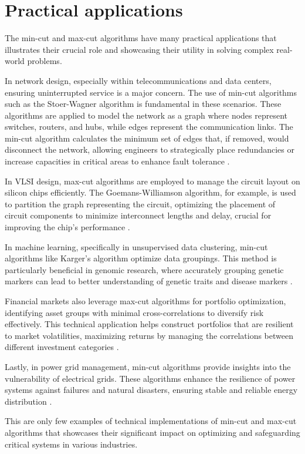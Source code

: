 \section{Practical applications}

The min-cut and max-cut algorithms have many practical applications that illustrates their crucial role and showcasing their utility in solving complex real-world problems.

In network design, especially within telecommunications and data centers, ensuring uninterrupted service is a major concern. The use of min-cut algorithms such as the Stoer-Wagner algorithm is fundamental in these scenarios. These algorithms are applied to model the network as a graph where nodes represent switches, routers, and hubs, while edges represent the communication links. The min-cut algorithm calculates the minimum set of edges that, if removed, would disconnect the network, allowing engineers to strategically place redundancies or increase capacities in critical areas to enhance fault tolerance \cite{stoer1997simple}.

In VLSI design, max-cut algorithms are employed to manage the circuit layout on silicon chips efficiently. The Goemans-Williamson algorithm, for example, is used to partition the graph representing the circuit, optimizing the placement of circuit components to minimize interconnect lengths and delay, crucial for improving the chip's performance \cite{goemans1995improved}.

In machine learning, specifically in unsupervised data clustering, min-cut algorithms like Karger's algorithm optimize data groupings. This method is particularly beneficial in genomic research, where accurately grouping genetic markers can lead to better understanding of genetic traits and disease markers \cite{karger1993global}.

Financial markets also leverage max-cut algorithms for portfolio optimization, identifying asset groups with minimal cross-correlations to diversify risk effectively. This technical application helps construct portfolios that are resilient to market volatilities, maximizing returns by managing the correlations between different investment categories \cite{chopra1993partitioning}.

Lastly, in power grid management, min-cut algorithms provide insights into the vulnerability of electrical grids. These algorithms enhance the resilience of power systems against failures and natural disasters, ensuring stable and reliable energy distribution \cite{bienstock2010optimal}.

This are only few examples of technical implementations of min-cut and max-cut algorithms that showcases their significant impact on optimizing and safeguarding critical systems in various industries.

